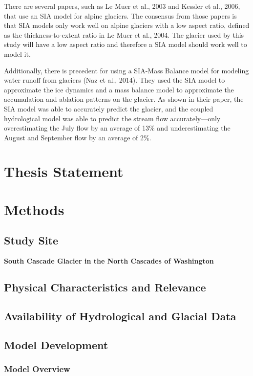 \documentclass{article}
\begin{document}
    There are several papers, such as Le Muer et al., 2003 and Kessler et al., 2006, that use an SIA model for alpine glaciers. The consensus 
from those papers is that SIA models only work well on alpine glaciers with a low aspect ratio, defined as the thickness-to-extent ratio in 
Le Muer et al., 2004. The glacier used by this study will have a low aspect ratio and therefore a SIA model should work well to model it.

    Additionally, there is precedent for using a SIA-Mass Balance model for modeling water runoff from glaciers (Naz et al., 2014). They used 
the SIA model to approximate the ice dynamics and a mass balance model to approximate the accumulation and ablation patterns on the glacier. 
As shown in their paper, the SIA model was able to accurately predict the glacier, and the coupled hydrological model was able to predict 
the stream flow accurately---only overestimating the July flow by an average of 13\% and underestimating the August and September flow by an 
average of 2\%.

\section{Thesis Statement}

\section{Methods}

\subsection{Study Site}
\textbf{South Cascade Glacier in the North Cascades of Washington}

\subsection{Physical Characteristics and Relevance}

\subsection{Availability of Hydrological and Glacial Data}

\subsection{Model Development}
\subsubsection{Model Overview}
\end{document}
